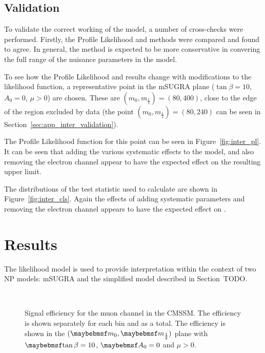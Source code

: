 \subsection{Validation}
To validate the correct working of the model, a number of cross-checks were
performed. Firstly, the Profile Likelihood and \CLs methods were compared and
found to agree. In general, the \CLs method is expected to be more conservative
in convering the full range of the nuisance parameters in the model.

To see how the Profile Likelihood and \CLs results change with modifications to
the likelihood function, a representative point in the \ac{mSUGRA} plane
($\tan\beta=10$, $A_0=0$, $\mu>0$) are chosen. These are $(m_0, m_{\frac{1}{2}})
= (80, 400)$, close to the edge of the region excluded by data (the point $(m_0,
m_{\frac{1}{2}}) = (80, 240)$ can be seen in
Section~\ref{sec:app_inter_validation}).

The Profile Likelihood function for this point can be seen in
Figure~\ref{fig:inter_pl}. It can be seen that adding the various systematic
effects to the model, and also removing the electron channel appear to have the
expected effect on the resulting upper limit.

The distributions of the test statistic used to calculate \CLs are shown in
Figure~\ref{fig:inter_cls}. Again the effects of adding systematic parameters
and removing the electron channel appears to have the expected effect on
\CLs.


\section{Results}
The likelihood model is used to provide interpretation within the context of two
\ac{NP} models: \ac{mSUGRA} and the \Ttwott simplified model described in
Section~TODO.

\begin{figure}[h!]
\centering
{}
\\
\caption[Signal efficiency for the muon channel in the \ac{CMSSM}]{Signal
  efficiency for the muon channel in the \ac{CMSSM}. The efficiency is shown
  separately for each \STlep bin and as a total. The efficiency is shown in the
  $(\Mzero, \Mhalf)$ plane with $\tanbeta=10$, $\Azero=0$ and $\mu > 0$.}
\label{fig:inter_msugra_mu}
\end{figure}

